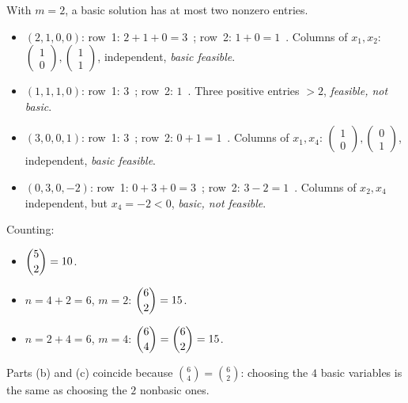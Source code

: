 \begin{solutions}
  \item With $m=2$, a basic solution has at most two nonzero entries.
        \begin{itemize}[leftmargin=1.8em,itemsep=0.3ex]
          \item[(a)] $(2,1,0,0)$: row~1: $2+1+0=3$~\checkmark; row~2:
                $1+0=1$~\checkmark. Columns of $x_{1},x_{2}$:
                $\begin{pmatrix}1\\0\end{pmatrix},
                 \begin{pmatrix}1\\1\end{pmatrix}$, independent,
                \emph{basic feasible}.
          \item[(b)] $(1,1,1,0)$: row~1: $3$~\checkmark; row~2:
                $1$~\checkmark. Three positive entries $>2$,
                \emph{feasible, not basic}.
          \item[(c)] $(3,0,0,1)$: row~1: $3$~\checkmark; row~2:
                $0+1=1$~\checkmark. Columns of $x_{1},x_{4}$:
                $\begin{pmatrix}1\\0\end{pmatrix},
                 \begin{pmatrix}0\\1\end{pmatrix}$, independent,
                \emph{basic feasible}.
          \item[(d)] $(0,3,0,-2)$: row~1: $0+3+0=3$~\checkmark; row~2:
                $3-2=1$~\checkmark. Columns of $x_{2},x_{4}$ independent,
                but $x_{4}=-2<0$, \emph{basic, not feasible}.
        \end{itemize}

  \item Counting:
        \begin{itemize}[leftmargin=1.8em,itemsep=0.3ex]
          \item[(a)] $\dbinom{5}{2}=10$.
          \item[(b)] $n=4+2=6$, $m=2$: $\dbinom{6}{2}=15$.
          \item[(c)] $n=2+4=6$, $m=4$: $\dbinom{6}{4}=\dbinom{6}{2}=15$.
        \end{itemize}
        Parts (b) and (c) coincide because
        $\binom{6}{4}=\binom{6}{2}$: choosing the $4$ basic variables is
        the same as choosing the $2$ nonbasic ones.


\end{solutions}
